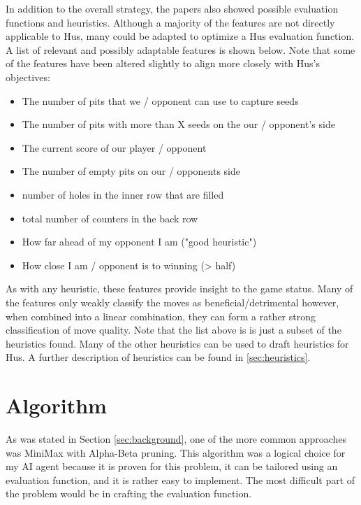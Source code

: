 \documentclass[]{article}
\begin{document}
In addition to the overall strategy, the papers also showed possible evaluation functions and heuristics. Although a majority of the features are not directly applicable to Hus, many could be adapted to optimize a Hus evaluation function. %
A list of relevant and possibly adaptable features is shown below. Note that some of the features have been altered slightly to align more closely with Hus's objectives:

\begin{itemize}
\item The number of pits that we / opponent can use to capture seeds \cite{abayomi2013overview}
\item The number of pits with more than X seeds on the our / opponent’s side \cite{abayomi2013overview} 
\item The current score of our player / opponent \cite{abayomi2013overview}
\item The number of empty pits on our / opponents side \cite{abayomi2013overview}

\item number of holes in the inner row that are filled \cite{donkers2002programming}
\item total number of counters in the back row \cite{donkers2002programming}

\item How far ahead of my opponent I am ("good heuristic") \cite{gifford2008searching}
\item How close I am / opponent is to winning (> half) \cite{gifford2008searching}
\end{itemize}

As with any heuristic, these features provide insight to the game status. Many of the features only weakly classify the moves as beneficial/detrimental however, when combined into a linear combination, they can form a rather strong classification of move quality. Note that the list above is is just a subset of the heuristics found. Many of the other heuristics can be used to draft heuristics for Hus. A further description of heuristics can be found in \ref{sec:heuristics}.


\section{Algorithm}
As was stated in Section \ref{sec:background}, one of the more common approaches was MiniMax with Alpha-Beta pruning. This algorithm was a logical choice for my AI agent because it is proven for this problem, it can be tailored using an evaluation function, and it is rather easy to implement. The most difficult part of the problem would be in crafting the evaluation function.
\end{document}
